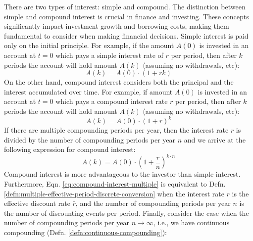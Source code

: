 \documentclass[11pt]{article}
\theoremstyle{definition}
\begin{document}
There are two types of interest: simple and compound. The distinction between simple and compound interest is crucial in finance and investing.
These concepts significantly impact investment growth and borrowing costs, making them fundamental to consider when making financial decisions. 
Simple interest is paid only on the initial principle. 
For example, if the amount $A(0)$ is invested in an account at $t=0$ which pays a simple interest rate of $r$ per period, 
then after $k$ periods the account will hold amount $A(k)$ (assuming no withdrawals, etc):
\begin{equation}\label{eq:simple-interest}
A(k) = A(0)\cdot\left(1+rk\right)
\end{equation}
On the other hand, compound interest considers both the principal and the interest accumulated over time. 
For example, if amount $A(0)$ is invested in an account at $t=0$ which pays a compound interest rate $r$ per period, 
then after $k$ periods the account will hold amount $A(k)$ (assuming no withdrawals, etc):
\begin{equation}\label{eq:compound-interest}
A(k) = A(0)\cdot\left(1+r\right)^k
\end{equation}
If there are multiple compounding periods per year, then the interest rate $r$ is divided by the number of compounding periods per year $n$
and we arrive at the following expression for compound interest:
\begin{equation}\label{eq:compound-interest-multiple}
A(k) = A(0)\cdot\left(1+\frac{r}{n}\right)^{k\cdot{n}}
\end{equation}
Compound interest is more advantageous to the investor than simple interest. 
Furthermore, Eqn. \eqref{eq:compound-interest-multiple} is equivalent to Defn. \ref{defn:multiple-effective-period-discrete-conversion}
when the interest rate $r$ is the effective discount rate $\bar{r}$, and the number of compounding periods per year $n$ is the number of discounting events per period.
Finally, consider the case when the number of compounding periods per year $n\rightarrow\infty$, i.e., we have continuous compounding (Defn. \ref{defn:continuous-compounding}):
\end{document}
